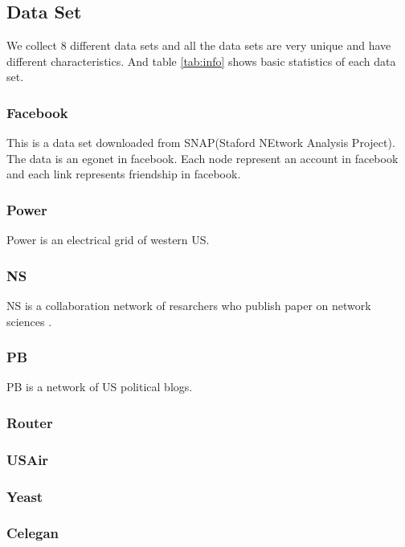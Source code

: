 \documentclass[12pt]{article}
\begin{document}
\subsection {Data Set}
We collect 8 different data sets and all the data sets are very unique and have different characteristics. And table \ref{tab:info} shows basic statistics of each data set.
\subsubsection{Facebook}
This is a data set downloaded from SNAP(Staford NEtwork Analysis Project)\cite{snapnets}. The data is an egonet in facebook. Each node represent an account in facebook and each link represents friendship in facebook.
\subsubsection{Power}
Power is  an electrical grid of western US\cite{small_world}.
\subsubsection{NS}
NS is a collaboration network of resarchers who publish paper on network sciences \cite{Newman_2006}.
\subsubsection{PB}
PB is a network of US political blogs.\cite{pb}
\subsubsection{Router}
\subsubsection{USAir}
\subsubsection{Yeast}
\subsubsection{Celegan}
\end{document}

